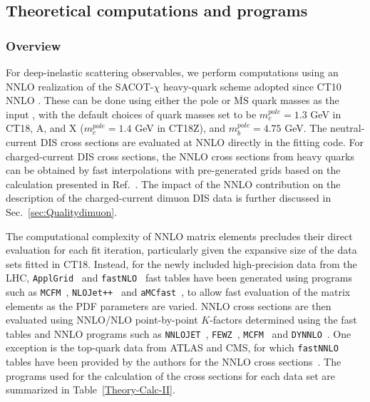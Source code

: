 \subsection{Theoretical computations and programs \label{sec:calcs}}
\subsubsection{Overview
\label{sec:TheorySettings}}
%
%

For deep-inelastic scattering observables, we perform computations using an NNLO realization \cite{Guzzi:2011ew} of the SACOT-$\chi$ heavy-quark scheme \cite{Aivazis:1993pi,Aivazis:1993kh,Kramer:2000hn,Tung:2001mv} adopted since CT10 NNLO \cite{Gao:2013xoa}. These can be done using either the pole or $\overline{\mathrm{MS}}$ quark masses as the input \cite{Gao:2013wwa}, with the default choices of quark masses set to be $m_c^{pole}=1.3$ GeV in CT18, A, and X ($m_c^{pole}=1.4$ GeV in CT18Z), and $m_b^{pole}=4.75$ GeV.  The neutral-current DIS cross sections are evaluated at NNLO directly in the fitting code. For charged-current DIS cross sections,  the NNLO cross sections from heavy quarks can be obtained by fast interpolations with pre-generated grids based on the calculation presented in Ref.~\cite{Berger:2016inr}. The impact of the NNLO contribution on the description of the charged-current dimuon DIS data is further discussed in Sec.~\ref{sec:Qualitydimuon}.

The computational complexity of NNLO matrix elements precludes their direct evaluation for each fit iteration, particularly given the expansive size of the data sets fitted in CT18. Instead, for the
newly included high-precision data from the LHC, \texttt{ApplGrid}~\cite{Carli:2010rw} and \texttt{fastNLO}~\cite{Wobisch:2011ij} 
fast tables have been generated using programs such as \texttt{MCFM}~\cite{Campbell:2010ff}, \texttt{NLOJet++}~\cite{Nagy:2003tz} and 
\texttt{aMCfast}~\cite{Bertone:2014zva}, to allow fast evaluation of the matrix elements as the PDF parameters are varied. 
NNLO cross sections are then evaluated using NNLO/NLO point-by-point $K$-factors determined using the fast tables and NNLO programs such 
as \texttt{NNLOJET}~\cite{Buza:1997mg,Ridder:2015dxa,Gehrmann-DeRidder:2017mvr,Currie:2016bfm,Currie:2017ctp}, \texttt{FEWZ}~\cite{Gavin:2010az,Gavin:2012sy,Li:2012wna}, 
\texttt{MCFM}~\cite{Campbell:2010ff,Boughezal:2016wmq,MCFM8} and \texttt{DYNNLO}~\cite{Catani:2007vq,Catani:2009sm}. 
One exception is the top-quark data from ATLAS and CMS, for which \texttt{fastNNLO} tables have been 
provided by the authors for the NNLO cross sections~\cite{Czakon:2016dgf,Czakon:2018nun}. The programs used for the calculation of the cross sections for each data set are summarized 
in Table~\ref{Theory-Calc-II}. 

